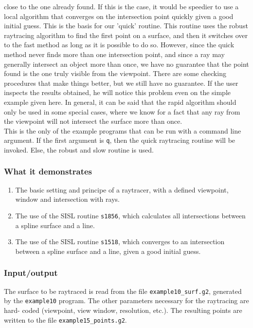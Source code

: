 close to the one already found.  If this is the case, it would be speedier to use a local 
algorithm that converges on the intersection point quickly given a good initial guess.  This is
the basis for our 'quick' routine.  This routine uses the robust raytracing algorithm to find
the first point on a surface, and then it switches over to the fast method as long as it is 
possible to do so.  However, since the quick method never finds more than one intersection point,
and since a ray may generally intersect an object more than once, we have no guarantee that
the point found is the one truly visible from the viewpoint.  There are some checking procedures
that make things better, but we still have no guarantee.   If the user inspects the results 
obtained, he will notice this problem even on the simple example given here.  In general, it
can be said that the rapid algorithm should only be used in some special cases, where we know
for a fact that any ray from the viewpoint will not intersect the surface more than once.\\

This is the only of the example programs that can be run with a command line argument.  If the 
first argument is \verb/q/, then the quick raytracing routine will be invoked.  Else, the
robust and slow routine is used.

\subsubsection{What it demonstrates}
\begin{enumerate}
\item The basic setting and principe of a raytracer, with a defined viewpoint, window and 
intersection with rays.
\item The use of the SISL routine \verb/s1856/, which calculates all intersections between a 
spline surface and a line.
\item The use of the SISL routine \verb/s1518/, which converges to an intersection between
a spline surface and a line, given a good initial guess.
\end{enumerate}
\subsubsection{Input/output}
The surface to be raytraced is read from the file \verb/example10_surf.g2/, generated by
the \verb/example10/ program.  The other parameters necessary for the raytracing are hard-
coded (viewpoint, view window, resolution, etc.).  The resulting points are written to the
file \verb/example15_points.g2/. 